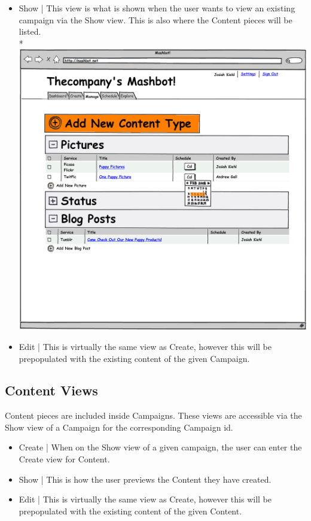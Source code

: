 \documentclass{report}
\begin{document}
\begin{itemize}
\item Show | This view is what is shown when the user wants to view an existing campaign via the Show view.  This is also where the Content pieces will be listed. \\*
  \includegraphics[width=\textwidth]{../mockups/manage-addcontent.png}
\item Edit | This is virtually the same view as Create, however this will be prepopulated with the existing content of the given Campaign.
\end{itemize}
\subsection{Content Views}
Content pieces are included inside Campaigns.  These views are accessible via the Show view of a Campaign for the corresponding Campaign id.
\begin{itemize}
\item Create | When on the Show view of a given campaign, the user can enter the Create view for Content.
\item Show | This is how the user previews the Content they have created.
\item Edit | This is virtually the same view as Create, however this will be prepopulated with the existing content of the given Content.
\end{itemize}
\end{document}
